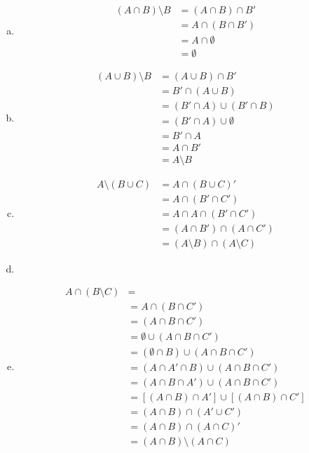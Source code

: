 \begin{enumerate}[(a)]
\item
\begin{align*}
(A\cap B) \setminus B & =(A\cap B)\cap B'\\
& = A\cap (B\cap B')\\
& = A\cap \emptyset\\
& = \emptyset
\end{align*}

\item
\begin{align*}
(A\cup B) \setminus B & =(A\cup B)\cap B'\\
& = B'\cap (A\cup B)\\
& = (B'\cap A)\cup(B'\cap B)\\
& = (B'\cap A)\cup \emptyset\\
& = B'\cap A\\
& = A\cap B'\\
& = A\setminus B
\end{align*}

\item
\begin{align*}
A\setminus (B\cup C) & =A\cap (B\cup C)'\\
& = A\cap (B'\cap C')\\
& = A\cap A\cap(B'\cap C')\\
& = (A\cap B')\cap (A\cap C')\\
& = (A\setminus B)\cap (A\setminus C)
\end{align*}
\item

\item
\begin{align*}
A \cap (B \setminus C) &= \\
&= A \cap (B \cap C')\\
&= (A \cap B \cap C')\\
&= \emptyset \cup (A \cap B \cap C')\\
&= (\emptyset \cap B) \cup (A \cap B \cap C')\\
&= (A \cap A' \cap B) \cup (A \cap B \cap C')\\
&= (A \cap B \cap A') \cup (A \cap B \cap C')\\
&= [(A \cap B) \cap A'] \cup [(A \cap B) \cap C']\\
&= (A \cap B) \cap (A' \cup C')\\
&= (A \cap B) \cap (A \cap C)'\\
&= (A \cap B) \setminus (A \cap C)
\end{align*}


\end{enumerate}
